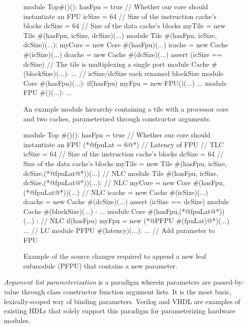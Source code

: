 \begin{figure}
\centering
\begin{phdl}
module Top#()():
  hasFpu = true  // Whether our core should instantiate an FPU
  icSize = 64    // Size of the instruction cache's blocks
  dcSize = 64    // Size of the data cache's blocks
  myTile = new Tile #(hasFpu, icSize, dcSize)(...)
module Tile #(hasFpu, icSize, dcSize)(...):
  myCore = new Core  #(hasFpu)(...)
  icache = new Cache #(icSize)(...)
  dcache = new Cache #(dcSize)(...)
  assert (icSize == dcSize)         // The tile is multiplexing a single port
module Cache #(blockSize)(...): ... // icSize/dcSize each renamed blockSize
module Core #(hasFpu)(...):
  if(hasFpu) myFpu = new FPU()(...) ...
module FPU #()(...): ...
\end{phdl} 
\caption{An example module hierarchy containing a tile with a processor core and two caches, parameterized through constructor arguments.}
\label{fig:arglist}
\end{figure}

\begin{figure}
\centering
\begin{phdl}
module Top #()():
  hasFpu = true  // Whether our core should instantiate an FPU
  (*@\textcolor[rgb]{1,0,0}{fpuLat = 6}@*)     // Latency of FPU                               // TLC
  icSize = 64    // Size of the instruction cache's blocks
  dcSize = 64    // Size of the data cache's blocks
  myTile = new Tile #(hasFpu, icSize, dcSize,(*@\textcolor[rgb]{1,0,0}{fpuLat}@*))(...)        // NLC
module Tile #(hasFpu, icSize, dcSize,(*@\textcolor[rgb]{1,0,0}{fpuLat}@*))(...):               // NLC
  myCore = new Core  #(hasFpu, (*@\textcolor[rgb]{1,0,0}{fpuLat}@*))(...)                      // NLC
  icache = new Cache #(icSize)(...)
  dcache = new Cache #(dcSize)(...)
  assert (icSize == dcSize) 
module Cache #(blockSize)(...) : ... 
module Core #(hasFpu,(*@\textcolor[rgb]{1,0,0}{fpuLat}@*))(...) :                              // NLC
  if(hasFpu) myFpu = new (*@\textcolor[rgb]{1,0,0}{PFPU \#(fpuLat)}@*)(...) ...                 // LC
module PFPU #(latency)(...): ...     // Add parameter to FPU 
\end{phdl}
\caption{Example of the source changes required to append a new leaf submodule (PFPU) that contains a new parameter.}
\label{fig:arglist-delta}
\end{figure}

\emph{Argument list parameterization} is a paradigm wherein parameters are passed-by-value through class constructor function argument lists. 
It is the most basic, lexically-scoped way of binding parameters.
Verilog and VHDL are examples of existing HDLs that solely support this paradigm for parameterizing hardware modules.
 
